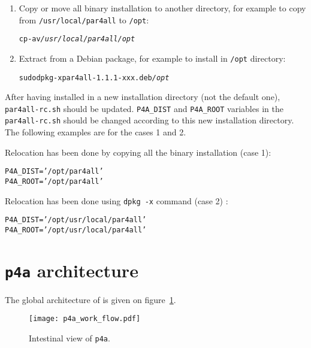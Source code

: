\documentclass[a4paper]{article}
\begin{document}
\begin{enumerate}
\item Copy or move all \Apfa binary installation to another directory, for
  example to copy from \texttt{/usr/local/par4all} to \texttt{/opt}:
\begin{alltt}
cp -av \emph{/usr/local/par4all} \emph{/opt}
\end{alltt}

\item Extract from a Debian package, for example to install
  \Apfa in \texttt{/opt} directory:
\begin{alltt}
sudo dpkg -x par4all-1.1.1-xxx.deb \emph{/opt}
\end{alltt}

\end{enumerate}

After having installed \Apfa in a new installation directory (not the
default one), \verb|par4all-rc.sh| should be updated.  \verb|P4A_DIST| and
\verb|P4A_ROOT| variables in the \verb|par4all-rc.sh| should be changed
according to this new installation directory.  The following examples are
for the cases 1 and 2.

Relocation has been done by copying all the binary installation (case 1):
\begin{alltt}
P4A_DIST='/opt/par4all'
P4A_ROOT='/opt/par4all'
\end{alltt}

Relocation has been done using \texttt{dpkg -x} command (case 2) :
\begin{alltt}
P4A_DIST='/opt/usr/local/par4all'
P4A_ROOT='/opt/usr/local/par4all'
\end{alltt}

\section{\protect\texttt{p4a} architecture}
\label{sec:p4a-architecture}

The global architecture of \Apfa is given on
figure~\ref{fig:transit_intestinal}.

\begin{figure}
  \texttt{[image: p4a\_work\_flow.pdf]}
  \caption{Intestinal view of \texttt{p4a}.}
  \label{fig:transit_intestinal}
\end{figure}
\end{document}
